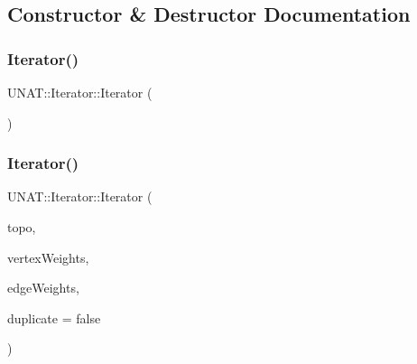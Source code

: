 \subsection{Constructor \& Destructor Documentation}
\mbox{\label{classUNAT_1_1Iterator_a3a341a86404dce424bc82e4a991ef29b}} 
\subsubsection{\texorpdfstring{Iterator()}{Iterator()}\hspace{0.1cm}{\footnotesize\ttfamily [1/4]}}
{\footnotesize\ttfamily U\+N\+A\+T\+::\+Iterator\+::\+Iterator (\begin{DoxyParamCaption}{ }\end{DoxyParamCaption})\hspace{0.3cm}{\ttfamily [inline]}}

\mbox{\label{classUNAT_1_1Iterator_acc1365ff1a2078c14424624b75fe2c7e}} 
\subsubsection{\texorpdfstring{Iterator()}{Iterator()}\hspace{0.1cm}{\footnotesize\ttfamily [2/4]}}
{\footnotesize\ttfamily U\+N\+A\+T\+::\+Iterator\+::\+Iterator (\begin{DoxyParamCaption}\item[{\mbox{\hyperlink{classUNAT_1_1Topology}{Topology}} \&}]{topo,  }\item[{\mbox{\hyperlink{include_2swMacro_8h_a113cf5f6b5377cdf3fac6aa4e443e9aa}{sw\+Int}} $\ast$}]{vertex\+Weights,  }\item[{\mbox{\hyperlink{include_2swMacro_8h_a113cf5f6b5377cdf3fac6aa4e443e9aa}{sw\+Int}} $\ast$}]{edge\+Weights,  }\item[{bool}]{duplicate = {\ttfamily false} }\end{DoxyParamCaption})\hspace{0.3cm}{\ttfamily [inline]}}

